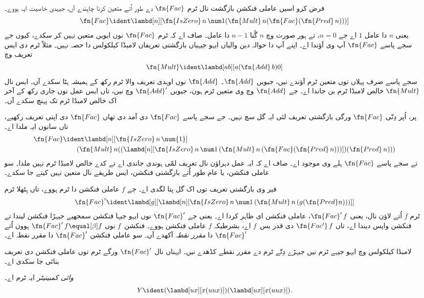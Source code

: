 \documentclass[../../../include/open-logic-section]{subfiles}
\begin{document}


فرض کرو اسیں عاملی فنکشن بازگشت نال ٹرم $\fn{Fac}$ دے طور
اُتے متعین کرنا چاہندے آں، جیہدی خاصیت ایہ ہووے۔
\[
\fn{Fac} \ident \lambd[n][\fn{IsZero}\, n\, \num 1 (\fn{Mult}\, n (\fn{Fac}(\fn{Pred} \, n)))]
\]
یعنی $n$ دا عامل $1$ اے جے $n = 0$، تے ہور صورت وچ
$n$ گُنا $n-1$ دا عامل۔ صاف اے کہ ٹرم $\fn{Fac}$ نوں
ایویں متعین نہیں کر سکدے، کیوں جے سجے پاسے $\fn{Fac}$ آپ
وی آؤندا اے۔ اپنے آپ دا حوالہ دین والیاں ایہو جیہیاں بازگشتی
تعریفاں لامبڈا کیلکولس دا حصہ نہیں۔ مثلاً ٹرم دی ایس تعریف وچ
\[
\fn{Mult} \ident \lambd[ab][a (\fn{Add}\, b) 0]
\]
سجے پاسے صرف پہلاں توں متعین ٹرم آؤندے نیں، جیویں $\fn{Add}$۔
$\fn{Add}$ نوں اوہدی تعریف والا ٹرم رکھ کے ہمیشہ ہٹا سکدے آں۔
ایس نال $\fn{Mult}$ خالص لامبڈا ٹرم بن جاندا اے۔ جے $\fn{Add}$
وچ وی متعین ٹرم ہون، جیویں $\fn{Add}'$ وچ نیں، تاں ایس عمل نوں
جاری رکھ کے آخر اک خالص لامبڈا ٹرم تک پہنچ سکدے آں۔

پر، اُپر دِتّی $\fn{Fac}$ ورگی بازگشتی تعریف لئی ایہ گل
سچ نہیں۔ جے سجے پاسے $\fn{Fac}$ دی آمد دی تھاں $\fn{Fac}$
دی اپنی تعریف رکھیے، تاں سانوں ایہ ملدا اے۔
\begin{align*}
  \fn{Fac} & \ident \lambd[n][\fn{IsZero}\, n\, \num{1}] \\
    & \qquad (\fn{Mult}\, n
  ((\lambd[n][\fn{IsZero} \, n \, \num 1\, (\fn{Mult}\, n\, (\fn{Fac}
    (\fn{Pred}\, n)))]) (\fn{Pred}\, n)))
\end{align*}
تے سجے پاسے $\fn{Fac}$ ہلے وی موجود اے۔ صاف اے کہ ایہ عمل
دہراؤن نال تعریف لمّی ہوندی جاندی اے تے کدے خالص لامبڈا ٹرم
نہیں ملدا۔ سو عاملی فنکشن، یا عام طور اُتے بازگشتی فنکشن،
ایس طریقے نال متعین نہیں کیتے جا سکدے۔

فیر وی بازگشتی تعریف توں اک گل پتا لگدی اے۔ جے $f$ عاملی
فنکشن دا ٹرم ہووے، تاں ہِٹھلا ٹرم
\[
\fn{Fac}' \ident \lambd[g][\lambd[n][\fn{IsZero} \, n \, \num 1\, (\fn{Mult} \, n\, (g (\fn{Pred} n)))]]
\]
ٹرم $f$ اُتے لاؤن نال، یعنی $\fn{Fac}'\,f$، عاملی فنکشن ای
ظاہر کردا اے۔ یعنی جے $\fn{Fac}'$ نوں ایہو جیہا فنکشن
سمجھیے جیہڑا فنکشن لیندا تے فنکشن واپس دیندا اے، تاں
$\fn{Fac'}\, f$ دی قدر بس~$f$ اے، بشرطیکہ $f$ عاملی
فنکشن ہووے۔ فنکشن~$f$ نوں $\fn{Fac}' \, f \equal[\beta] f$
ہوون اُتے $\fn{Fac}'$ دا \emph{مقرر نقطہ} آکھدے آں۔
سو عاملی فنکشن $\fn{Fac}'$ دا مقرر نقطہ اے۔

لامبڈا کیلکولس وچ ایہو جیہے ٹرم نیں جیہڑے دِتّے ٹرم دے مقرر
نقطے کڈھدے نیں۔ ایہناں نال $\fn{Fac}'$ ورگے ٹرم توں عاملی
فنکشن دی تعریف بنائی جا سکدی اے۔

\begin{defn}
  \emph{وائی کمبینیٹر} ایہ ٹرم اے۔
  \[
  Y \ident (\lambd[ux][x(uux)])(\lambd[ux][x(uux)]).
  \]
\end{defn}
\end{document}
